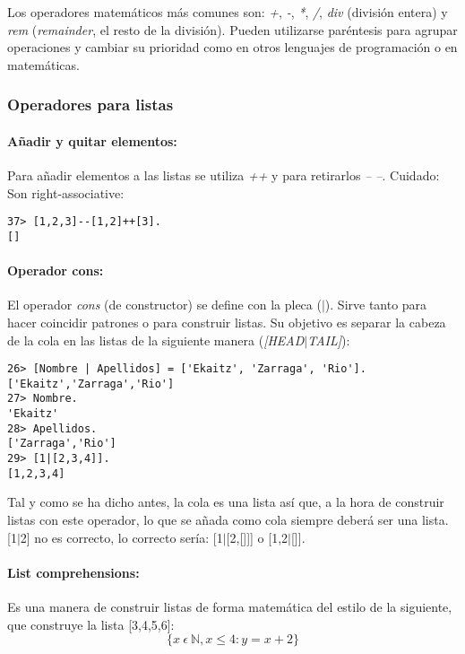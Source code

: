 Los operadores matemáticos más comunes son: \textit{+}, \textit{-}, \textit{*}, \textit{/}, \textit{div}
(división entera) y \textit{rem} (\textit{remainder}, el resto de la división). Pueden utilizarse paréntesis
para agrupar operaciones y cambiar su prioridad como en otros lenguajes de programación o en matemáticas.

\subsubsection{Operadores para listas}
\paragraph{Añadir y quitar elementos:} Para añadir elementos a las listas se utiliza \textit{++} y para
retirarlos \textit{-- --}. Cuidado: Son right-associative:
\begin{lstlisting}
37> [1,2,3]--[1,2]++[3].
[]
\end{lstlisting}


\paragraph{Operador cons:}
El operador \textit{cons} (de constructor) se define con la pleca ($|$). Sirve tanto para hacer
coincidir patrones o para construir listas. Su objetivo es separar la cabeza de la cola en las listas de la
siguiente manera (\textit{[HEAD$|$TAIL]}):

\begin{lstlisting}
26> [Nombre | Apellidos] = ['Ekaitz', 'Zarraga', 'Rio'].
['Ekaitz','Zarraga','Rio']
27> Nombre.
'Ekaitz'
28> Apellidos.
['Zarraga','Rio']
29> [1|[2,3,4]].
[1,2,3,4]
\end{lstlisting}

Tal y como se ha dicho antes, la cola es una lista así que, a la hora de construir listas con este operador,
lo que se añada como cola siempre deberá ser una lista. [1$|$2] no es correcto, lo correcto sería:
[1$|$[2,[]]] o [1,2$|$[]].

\paragraph{List comprehensions:}
Es una manera de construir listas de forma matemática del estilo de la siguiente, que construye la lista
[3,4,5,6]:
\begin{equation}
\{x\: \epsilon\: \mathbb{N}, x \leq  4: y = x+2\}
\end{equation}

